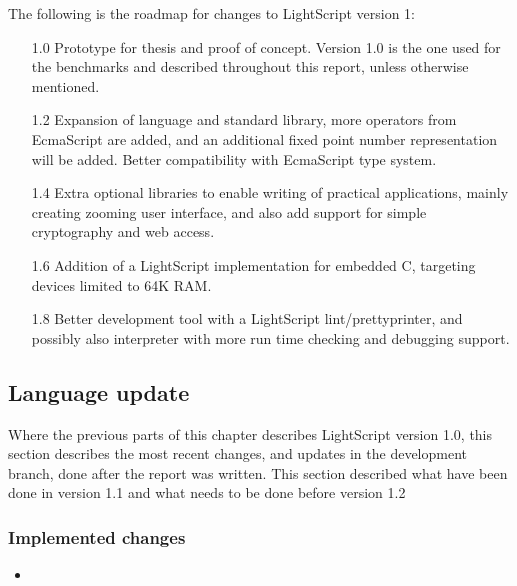 \documentclass[11pt]{report}
\begin{document}
The following is the roadmap for changes to LightScript version 1:
\begin{itemize}
\item[1.0]
Prototype for thesis and proof of concept.
Version 1.0 is the one used for the benchmarks and described throughout this report, unless otherwise mentioned. 
\item[1.2]
Expansion of language and standard library, more operators from EcmaScript are added,
and an additional fixed point number representation will be added. Better compatibility with EcmaScript type system.
\item[1.4]
Extra optional libraries to enable writing of practical applications, mainly creating zooming user interface, and also add support for simple cryptography and web access.
\item[1.6]
Addition of a LightScript implementation for embedded C, targeting devices limited to 64K RAM.
\item[1.8]
Better development tool with a LightScript lint/prettyprinter, and possibly also interpreter with more run time checking and debugging support.
\end{itemize}

\subsection{Language update}
Where the previous parts of this chapter describes LightScript version 1.0, this section describes the most recent changes, and updates in the development branch, done after the report was written.
This section described what have been done in version 1.1 and what needs to be done before version 1.2
\subsubsection{Implemented changes}
\begin{itemize}
\item
\end{itemize}
\end{document}
